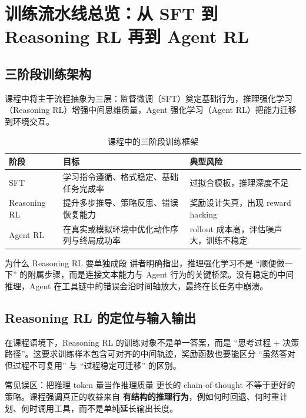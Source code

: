 \documentclass[a4paper]{article}
\begin{document}
\section{训练流水线总览：从 SFT 到 Reasoning RL 再到 Agent RL}

\subsection{三阶段训练架构}
课程中将主干流程抽象为三层：监督微调（SFT）奠定基础行为，推理强化学习（Reasoning RL）增强中间思维质量，Agent 强化学习（Agent RL）把能力迁移到环境交互。

\begin{table}[H]
\centering
\begin{tabular}{p{2.7cm}p{4.5cm}p{4.7cm}}
\toprule
\textbf{阶段} & \textbf{目标} & \textbf{典型风险} \\
\midrule
SFT & 学习指令遵循、格式稳定、基础任务完成率 & 过拟合模板，推理深度不足 \\
Reasoning RL & 提升多步推导、策略反思、错误恢复能力 & 奖励设计失真，出现 reward hacking \\
Agent RL & 在真实或模拟环境中优化动作序列与终局成功率 & rollout 成本高，评估噪声大，训练不稳定 \\
\bottomrule
\end{tabular}
\caption{课程中的三阶段训练框架}
\end{table}

\begin{importantbox}{为什么 Reasoning RL 要单独成段}
讲者明确指出，推理强化学习不是 ``顺便做一下'' 的附属步骤，而是连接文本能力与 Agent 行为的关键桥梁。没有稳定的中间推理，Agent 在工具链中的错误会沿时间轴放大，最终在长任务中崩溃。
\end{importantbox}

\subsection{Reasoning RL 的定位与输入输出}
在课程语境下，Reasoning RL 的训练对象不是单一答案，而是 ``思考过程 + 决策路径''。这要求训练样本包含可对齐的中间轨迹，奖励函数也要能区分 ``虽然答对但过程不可复用'' 与 ``过程稳定可迁移'' 的区别。

\begin{warningbox}{常见误区：把推理 token 量当作推理质量}
更长的 chain-of-thought 不等于更好的策略。课程强调真正的收益来自 \textbf{有结构的推理行为}，例如何时回退、何时重计划、何时调用工具，而不是单纯延长输出长度。
\end{warningbox}
\end{document}
